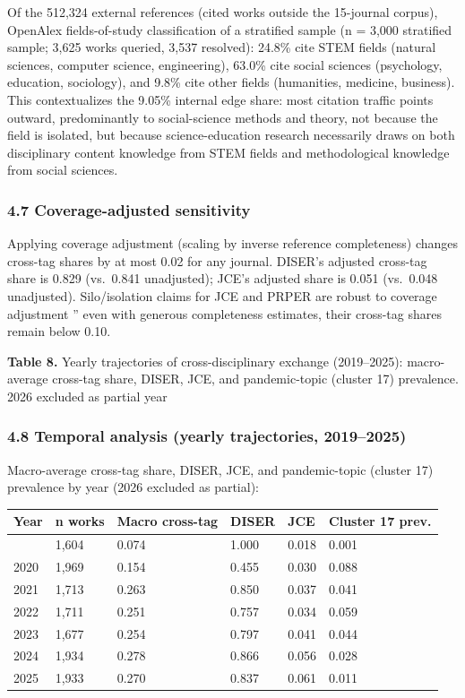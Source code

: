 \documentclass[pdflatex,sn-apa]{sn-jnl}
\newcounter{none}
\begin{document}
Of the 512,324 external references (cited works outside the 15-journal
corpus), OpenAlex fields-of-study classification of a stratified sample
(n = 3,000 stratified sample; 3,625 works queried, 3,537 resolved):
24.8\% cite STEM fields (natural sciences, computer science,
engineering), 63.0\% cite social sciences (psychology, education,
sociology), and 9.8\% cite other fields (humanities, medicine,
business). This contextualizes the 9.05\% internal edge share: most
citation traffic points outward, predominantly to social-science methods
and theory, not because the field is isolated, but because
science-education research necessarily draws on both disciplinary
content knowledge from STEM fields and methodological knowledge from
social sciences.

\subsubsection{4.7 Coverage-adjusted
sensitivity}\label{coverage-adjusted-sensitivity-1}

Applying coverage adjustment (scaling by inverse reference completeness)
changes cross-tag shares by at most 0.02 for any journal. DISER's
adjusted cross-tag share is 0.829 (vs.~0.841 unadjusted); JCE's adjusted
share is 0.051 (vs.~0.048 unadjusted). Silo/isolation claims for JCE and
PRPER are robust to coverage adjustment '' even with generous
completeness estimates, their cross-tag shares remain below 0.10.

\textbf{Table 8.} Yearly trajectories of cross-disciplinary exchange
(2019--2025): macro-average cross-tag share, DISER, JCE, and
pandemic-topic (cluster 17) prevalence. 2026 excluded as partial year

\subsubsection{4.8 Temporal analysis (yearly trajectories,
2019--2025)}\label{temporal-analysis-yearly-trajectories-20192025}

Macro-average cross-tag share, DISER, JCE, and pandemic-topic (cluster
17) prevalence by year (2026 excluded as partial):

{\def\LTcaptype{none} %
\begin{longtable}[]{@{}llllll@{}}
\toprule\noalign{}
Year & n works & Macro cross-tag & DISER & JCE & Cluster 17 prev. \\
\midrule\noalign{}
\endhead
\bottomrule\noalign{}
\endlastfoot
2019 & 1,604 & 0.074 & 1.000 & 0.018 & 0.001 \\
2020 & 1,969 & 0.154 & 0.455 & 0.030 & 0.088 \\
2021 & 1,713 & 0.263 & 0.850 & 0.037 & 0.041 \\
2022 & 1,711 & 0.251 & 0.757 & 0.034 & 0.059 \\
2023 & 1,677 & 0.254 & 0.797 & 0.041 & 0.044 \\
2024 & 1,934 & 0.278 & 0.866 & 0.056 & 0.028 \\
2025 & 1,933 & 0.270 & 0.837 & 0.061 & 0.011 \\
\end{longtable}
}
\end{document}

